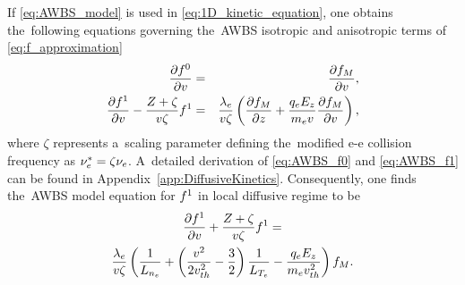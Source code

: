 If \eqref{eq:AWBS_model} is used in \eqref{eq:1D_kinetic_equation}, one obtains
the~following equations governing the~AWBS isotropic and anisotropic terms of 
\eqref{eq:f_approximation}
\begin{eqnarray}
  \frac{\partial{f^0}}{\partial{v}} &=& \frac{\partial{f_M}}{\partial{v}} ,
  \label{eq:AWBS_f0} \\
  \frac{\partial{f^1}}{\partial{v}}  
  - \frac{Z + \zeta}{v\zeta} f^1 &=& 
  \frac{\lambda_e}{v\zeta}
  \left(\frac{\partial{f_M}}{\partial{z}} + \frac{q_eE_z}{m_ev}\frac{\partial{f_M}}{\partial{v}}\right) ,
  \label{eq:AWBS_f1} 
\end{eqnarray}
where $\zeta$ represents a~scaling parameter defining the~modified
e-e collision frequency as $\nu_{e}^* = \zeta \nu_{e}$.
A~detailed derivation of \eqref{eq:AWBS_f0} and \eqref{eq:AWBS_f1} 
can be found in Appendix~\ref{app:DiffusiveKinetics}.
Consequently, one finds the~AWBS model equation for $f^1$ 
in local diffusive regime to be
\begin{multline}
  \frac{\partial{f^1}}{\partial{v}} + \frac{Z + \zeta}{v\zeta}f^1
  = \\
  \frac{\lambda_e}{v\zeta}\left(\frac{1}{L_{n_e}} + 
  \left( \frac{v^2}{2 v_{th}^2} - \frac{3}{2}\right)
  \frac{1}{L_{T_e}} - \frac{q_eE_z}{m_ev_{th}^2}\right)f_M .
  \label{eq:AWBS_f1_ODE}
\end{multline}
